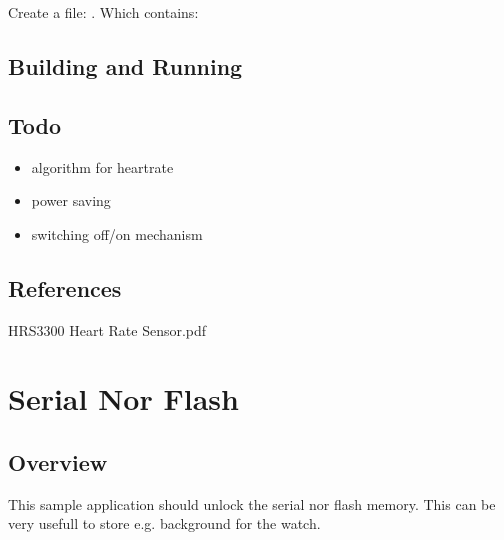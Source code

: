 \documentclass[letterpaper,10pt,english]{sphinxmanual}
\begin{document}
Create a file: .
Which contains:

\begin{sphinxVerbatim}[commandchars=\\\{\}]
 
\end{sphinxVerbatim}


\subsection{Building and Running}
\label{\detokenize{drivers/hrs3300:building-and-running}}

\subsection{Todo}
\label{\detokenize{drivers/hrs3300:todo}}\begin{itemize}
\item {} 
algorithm for heartrate

\item {} 
power saving

\item {} 
switching off/on mechanism

\end{itemize}


\subsection{References}
\label{\detokenize{drivers/hrs3300:references}}
HRS3300 Heart Rate Sensor.pdf


\section{Serial Nor Flash}
\label{\detokenize{drivers/spinor:serial-nor-flash}}\label{\detokenize{drivers/spinor::doc}}
\begin{sphinxVerbatim}[commandchars=\\\{\}]
\end{sphinxVerbatim}


\subsection{Overview}
\label{\detokenize{drivers/spinor:overview}}
This sample application should unlock the serial nor flash memory.
This can be very usefull to store e.g. background for the watch.
\end{document}
